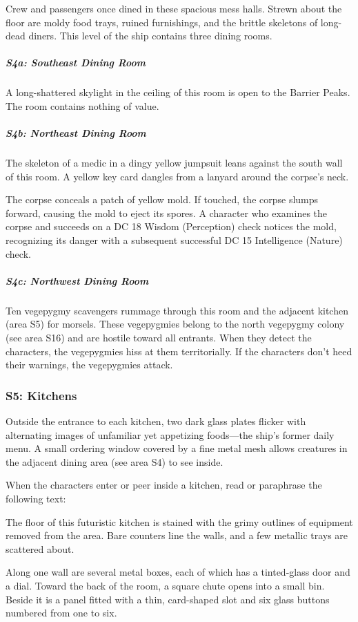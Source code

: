 \documentclass[10pt,a4paper,twoside,bg=print,twocolumn,openany,nodeprecatedcode]{dndbook}
\begin{document}
Crew and passengers once dined in these spacious mess halls. Strewn about the floor are moldy food trays, ruined furnishings, and the brittle skeletons of long-dead diners. This level of the ship contains three dining rooms.

\subparagraph{S4a: Southeast Dining Room}
A long-shattered skylight in the ceiling of this room is open to the Barrier Peaks. The room contains nothing of value.

\subparagraph{S4b: Northeast Dining Room}
The skeleton of a medic in a dingy yellow jumpsuit leans against the south wall of this room. A yellow key card dangles from a lanyard around the corpse's neck.

The corpse conceals a patch of yellow mold. If touched, the corpse slumps forward, causing the mold to eject its spores. A character who examines the corpse and succeeds on a DC 18 Wisdom (Perception) check notices the mold, recognizing its danger with a subsequent successful DC 15 Intelligence (Nature) check.

\subparagraph{S4c: Northwest Dining Room}
Ten vegepygmy scavengers rummage through this room and the adjacent kitchen (area S5) for morsels. These vegepygmies belong to the north vegepygmy colony (see area S16) and are hostile toward all entrants. When they detect the characters, the vegepygmies hiss at them territorially. If the characters don't heed their warnings, the vegepygmies attack.

\subsubsection{S5: Kitchens}
Outside the entrance to each kitchen, two dark glass plates flicker with alternating images of unfamiliar yet appetizing foods—the ship's former daily menu. A small ordering window covered by a fine metal mesh allows creatures in the adjacent dining area (see area S4) to see inside.

When the characters enter or peer inside a kitchen, read or paraphrase the following text:

\begin{DndReadAloud}{}
The floor of this futuristic kitchen is stained with the grimy outlines of equipment removed from the area. Bare counters line the walls, and a few metallic trays are scattered about.

Along one wall are several metal boxes, each of which has a tinted-glass door and a dial. Toward the back of the room, a square chute opens into a small bin. Beside it is a panel fitted with a thin, card-shaped slot and six glass buttons numbered from one to six.

\end{DndReadAloud}
\end{document}
